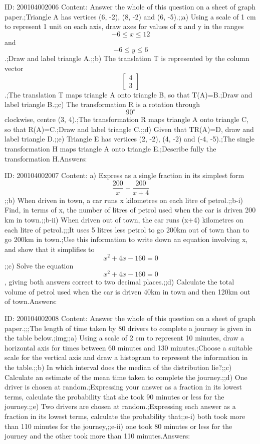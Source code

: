 \documentclass{article}
\begin{document}
ID: 200104002006
Content:
Answer the whole of this question on a sheet of graph paper.;Triangle A has vertices (6, -2), (8, -2) and (6, -5).;;a) Using a scale of 1 cm to represent 1 unit on each axis, draw axes for values of x and y in the ranges $$-6 \leq x \leq 12$$ and $$-6 \leq y \leq 6$$.;Draw and label triangle A.;;b) The translation T is represented by the column vector $$\begin{bmatrix}4\\3\end{bmatrix}$$.;The translation T maps triangle A onto triangle B, so that T(A)=B.;Draw and label triangle B.;;c) The transformation R is a rotation through $$90^{\circ}$$ clockwise, centre (3, 4).;The transformation R maps triangle A onto triangle C, so that R(A)=C.;Draw and label triangle C.;;d) Given that TR(A)=D, draw and label triangle D.;;e) Triangle E has vertices (2, -2), (4, -2) and (-4, -5).;The single transformation H maps triangle A onto triangle E.;Describe fully the transformation H.Answers:

ID: 200104002007
Content:
a) Express as a single fraction in its simplest form $$\frac{200}{x} - \frac{200}{x +4} $$;;b) When driven in town, a car runs x kilometres on each litre of petrol.;;b-i) Find, in terms of x, the number of litres of petrol used when the car is driven 200 km in town.;;b-ii) When driven out of town, the car runs (x+4) kilometres on each litre of petrol.;;;It uses 5 litres less petrol to go 200km out of town than to go 200km in town.;Use this information to write down an equation involving x, and show that it simplifies to $$x^2 + 4x - 160 = 0$$;;c) Solve the equation $$x^2 + 4x - 160 = 0$$, giving both answers correct to two decimal places.;;d) Calculate the total volume of petrol used when the car is driven 40km in town and then 120km out of town.Answers:

ID: 200104002008
Content:
Answer the whole of this question on a sheet of graph paper.;;;The length of time taken by 80 drivers to complete a journey is given in the table below.;img;;a) Using a scale of 2 cm to represent 10 minutes, draw a horizontal axis for times between 60 minutes and 130 minutes.;Choose a suitable scale for the vertical axis and draw a histogram to represent the information in the table.;;b) In which interval does the median of the distribution lie?;;c) Calculate an estimate of the mean time taken to complete the journey.;;d) One driver is chosen at random.;Expressing your answer as a fraction in its lowest terms, calculate the probability that she took 90 minutes or less for the journey.;;e) Two drivers are chosen at random.;Expressing each answer as a fraction in its lowest terms, calculate the probability that;;e-i) both took more than 110 minutes for the journey,;;e-ii) one took 80 minutes or less for the journey and the other took more than 110 minutes.Answers:
\end{document}
